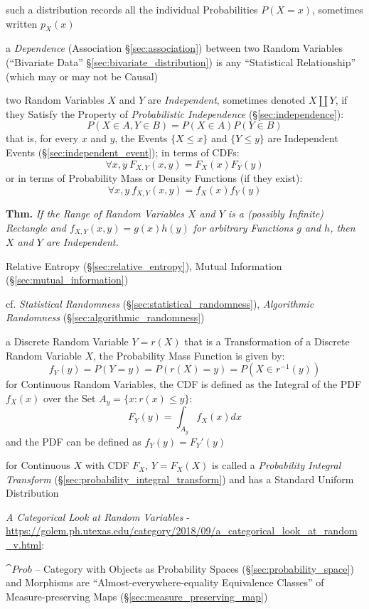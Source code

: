 such a distribution records all the individual Probabilities $P(X = x)$,
sometimes written $p_X(x)$

a \emph{Dependence} (Association \S\ref{sec:association}) between two Random
Variables (``Bivariate Data'' \S\ref{sec:bivariate_distribution}) is any
``Statistical Relationship'' (which may or may not be Causal)

two Random Variables $X$ and $Y$ are \emph{Independent}, sometimes denoted $X
\coprod Y$, if they Satisfy the Property of \emph{Probabilistic Independence}
(\S\ref{sec:independence}):
\[
  P(X \in A, Y \in B) = P(X \in A) P(Y \in B)
\]
that is, for every $x$ and $y$, the Events $\{X \leq x\}$ and $\{Y \leq y\}$ are
Independent Events (\S\ref{sec:independent_event}); in terms of CDFs:
\[
  \forall x,y\ F_{X,Y}(x,y) = F_X(x)F_Y(y)
\]
or in terms of Probability Mass or Density Functions (if they exist):
\[
  \forall x,y\ f_{X,Y}(x,y) = f_X(x)f_Y(y)
\]

\textbf{Thm.} \emph{If the Range of Random Variables $X$ and $Y$ is a (possibly
  Infinite) Rectangle and $f_{X,Y}(x,y) = g(x)h(y)$ for arbitrary Functions $g$
  and $h$, then $X$ and $Y$ are Independent.}

\fist Relative Entropy (\S\ref{sec:relative_entropy}), Mutual Information
(\S\ref{sec:mutual_information})

cf. \emph{Statistical Randomness} (\S\ref{sec:statistical_randomness}),
\emph{Algorithmic Randomness} (\S\ref{sec:algorithmic_randomness})

a Discrete Random Variable $Y = r(X)$ that is a Transformation of a Discrete
Random Variable $X$, the Probability Mass Function is given by:
\[
  f_Y(y) = P(Y = y) = P(r(X) = y) = P(X \in r^{-1}(y))
\]
for Continuous Random Variables, the CDF is defined as the Integral of the PDF
$f_X(x)$ over the Set $A_y = \{x : r(x) \leq y\}$:
\[
  F_Y(y) = \int_{A_y} f_X(x) dx
\]
and the PDF can be defined as $f_Y(y) = F_Y'(y)$

for Continuous $X$ with CDF $F_X$, $Y = F_X(X)$ is called a \emph{Probability
  Integral Transform} (\S\ref{sec:probability_integral_transform}) and has a
Standard Uniform Distribution

\asterism

\emph{A Categorical Look at Random Variables} -
\url{https://golem.ph.utexas.edu/category/2018/09/a_categorical_look_at_random_v.html}:

$\cat{Prob}$ -- Category with Objects as Probability Spaces
(\S\ref{sec:probability_space}) and Morphisms are ``Almost-everywhere-equality
Equivalence Classes'' of Measure-preserving Maps
(\S\ref{sec:measure_preserving_map})

